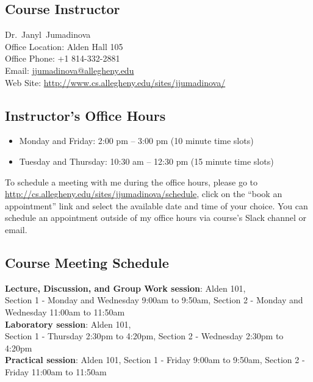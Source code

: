 


\usepackage[compact]{titlesec}



\subsection*{Course Instructor}
Dr.\ Janyl\ Jumadinova\\
\noindent Office Location: Alden Hall 105 \\
\noindent Office Phone: +1 814-332-2881 \\
\noindent Email: \url{jjumadinova@allegheny.edu} \\
\noindent Web Site: \url{http://www.cs.allegheny.edu/sites/jjumadinova/} 

\subsection*{Instructor's Office Hours}

\begin{itemize}
  \itemsep 0em
  \item Monday and Friday: 2:00 pm -- 3:00 pm (10 minute time slots)
  \item Tuesday and Thursday: 10:30 am -- 12:30 pm (15 minute time slots)
\end{itemize}

\noindent To schedule a meeting with me during the office hours, please go to  \url{http://cs.allegheny.edu/sites/jjumadinova/schedule}, click on the ``book an appointment'' link 
 and select the available date and time of your choice. You can schedule an appointment outside of my office hours via course's Slack channel or email.

\subsection*{Course Meeting Schedule}

\noindent \textbf{Lecture, Discussion, and Group Work session}: Alden 101, \\ Section 1 - Monday and Wednesday 9:00am to 9:50am, Section 2 - Monday and Wednesday 11:00am to 11:50am \\
\textbf{Laboratory session}: Alden 101, \\ Section 1 - Thursday 2:30pm to 4:20pm, Section 2 - Wednesday 2:30pm to 4:20pm \\
\textbf{Practical session}: Alden 101, Section 1 - Friday 9:00am to 9:50am, Section 2 - Friday 11:00am to 11:50am

